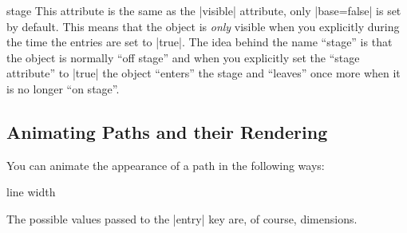 \begin{animateattribute}{stage}
    This attribute is the same as the |visible| attribute, only |base=false| is
    set by default. This means that the object is \emph{only} visible when you
    explicitly during the time the entries are set to |true|. The idea behind
    the name ``stage'' is that the object is normally ``off stage'' and when
    you explicitly set the ``stage attribute'' to |true| the object ``enters''
    the stage and ``leaves'' once more when it is no longer ``on stage''.
\begin{codeexample}[animation list={-1,0,1,2,3},animation bb={(1.3,-0.7) rectangle (2.7,0.7)}]
\end{codeexample}
\end{animateattribute}


\subsection{Animating Paths and their Rendering}
\label{section-base-animation-paths}

You can animate the appearance of a path in the following ways:

\begin{animateattribute}{line width}
\begin{codeexample}[animation list={0.5,1,1.5,2}]
\end{codeexample}
    The possible values passed to the |entry| key are, of course, dimensions.
\end{animateattribute}

